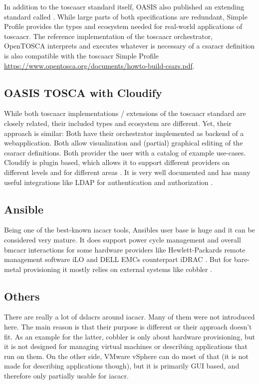 In addition to the \gls{toscaacr} standard itself, OASIS also published an extending standard called  \cite{tosca_simple_profile_v1_3}. While large parts of both specifications are redundant, Simple Profile provides the types and ecosystem needed for real-world applications of \gls{toscaacr}. The reference implementation of the \gls{toscaacr} orchestrator, OpenTOSCA interprets and executes whatever is necessary of a \gls{csaracr} definition is also compatible with the \gls{toscaacr} Simple Profile \url{https://www.opentosca.org/documents/howto-build-csars.pdf}.


\subsection{OASIS TOSCA with Cloudify}
While both \gls{toscaacr} implementations / extensions of the \gls{toscaacr} standard are closely related, their included types and ecosystem are different. Yet, their approach is similar: Both have their orchestrator implemented as backend of a webapplication. Both allow visualization and (partial) graphical editing of the \gls{csaracr} definitions. Both provider the user with a catalog of example use-cases.
\newline
Cloudify is plugin based, which allows it to support different providers on different levels and for different areas \cite{cloudify_plugins}. It is very well documented and has many useful integrations like LDAP for authentication and authorization \cite{cloudify_ldap_integration}.

\subsection{Ansible}
Being one of the best-known \gls{iacacr} tools, Ansibles user base is huge and it can be considered very mature. It does support power cycle management and overall \gls{bmcacr} interactions for some hardware providers like Hewlett-Packards remote management software iLO and DELL EMCs counterpart iDRAC \cite{ansible_hpilo} \cite{ansible_idrac}. But for  bare-metal provisioning it mostly relies on external systems like cobbler \cite{ansible_cobbler}.

\subsection{Others}
There are really a lot of \gls{dslacr}s around \gls{iacacr}. Many of them were not introduced here. The main reason is that their purpose is different or their approach doesn't fit. As an example for the latter, cobbler is only about hardware provisioning, but it is not designed for managing virtual machines or describing applications that run on them. On the other side, VMware vSphere can do most of that (it is not made for describing applications though), but it is primarily GUI based, and therefore only partially usable for \gls{iacacr}.

